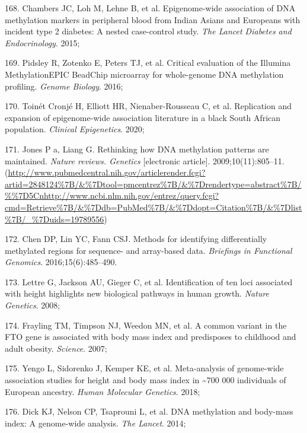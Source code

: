 \documentclass[11pt,oneside]{bristolthesis}
\newenvironment{cslreferences}%
  {}%
  {\par}
\begin{document}
\begin{cslreferences}
\leavevmode\hypertarget{ref-Chambers2015}{}%
168. Chambers JC, Loh M, Lehne B, et al. Epigenome-wide association of DNA methylation markers in peripheral blood from Indian Asians and Europeans with incident type 2 diabetes: A nested case-control study. \emph{The Lancet Diabetes and Endocrinology}. 2015;

\leavevmode\hypertarget{ref-Pidsley2016}{}%
169. Pidsley R, Zotenko E, Peters TJ, et al. Critical evaluation of the Illumina MethylationEPIC BeadChip microarray for whole-genome DNA methylation profiling. \emph{Genome Biology}. 2016;

\leavevmode\hypertarget{ref-ToinetCronje2020}{}%
170. Toinét Cronjé H, Elliott HR, Nienaber-Rousseau C, et al. Replication and expansion of epigenome-wide association literature in a black South African population. \emph{Clinical Epigenetics}. 2020;

\leavevmode\hypertarget{ref-Jones2009}{}%
171. Jones P a, Liang G. Rethinking how DNA methylation patterns are maintained. \emph{Nature reviews. Genetics} {[}electronic article{]}. 2009;10(11):805--11. (\url{http://www.pubmedcentral.nih.gov/articlerender.fcgi?artid=2848124\%7B/\&\%7Dtool=pmcentrez\%7B/\&\%7Drendertype=abstract\%7B/\%\%7D5Cnhttp://www.ncbi.nlm.nih.gov/entrez/query.fcgi?cmd=Retrieve\%7B/\&\%7Ddb=PubMed\%7B/\&\%7Ddopt=Citation\%7B/\&\%7Dlist\%7B/_\%7Duids=19789556})

\leavevmode\hypertarget{ref-Chen2016}{}%
172. Chen DP, Lin YC, Fann CSJ. Methods for identifying differentially methylated regions for sequence- and array-based data. \emph{Briefings in Functional Genomics}. 2016;15(6):485--490.

\leavevmode\hypertarget{ref-Lettre2008}{}%
173. Lettre G, Jackson AU, Gieger C, et al. Identification of ten loci associated with height highlights new biological pathways in human growth. \emph{Nature Genetics}. 2008;

\leavevmode\hypertarget{ref-Frayling2007}{}%
174. Frayling TM, Timpson NJ, Weedon MN, et al. A common variant in the FTO gene is associated with body mass index and predisposes to childhood and adult obesity. \emph{Science}. 2007;

\leavevmode\hypertarget{ref-Yengo2018}{}%
175. Yengo L, Sidorenko J, Kemper KE, et al. Meta-analysis of genome-wide association studies for height and body mass index in \textasciitilde700 000 individuals of European ancestry. \emph{Human Molecular Genetics}. 2018;

\leavevmode\hypertarget{ref-Dick2014}{}%
176. Dick KJ, Nelson CP, Tsaprouni L, et al. DNA methylation and body-mass index: A genome-wide analysis. \emph{The Lancet}. 2014;


\end{cslreferences}
\end{document}
